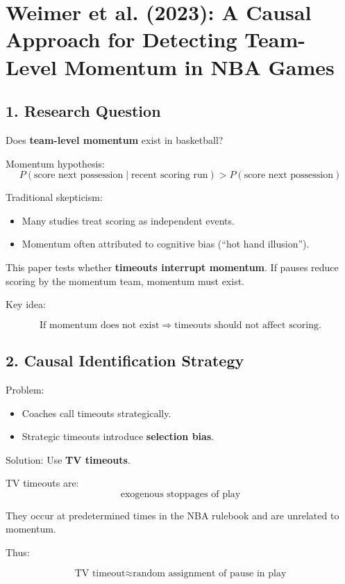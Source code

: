 \documentclass[11pt]{article}
\begin{document}
\psetheader

\section*{Weimer et al. (2023): A Causal Approach for Detecting Team-Level Momentum in NBA Games}

\subsection*{1. Research Question}

Does \textbf{team-level momentum} exist in basketball?

Momentum hypothesis:
\[
		P(\text{score next possession} \mid \text{recent scoring run})
		>
		P(\text{score next possession})
\]

Traditional skepticism:
\begin{itemize}
		\item Many studies treat scoring as independent events.
		\item Momentum often attributed to cognitive bias (``hot hand illusion'').
\end{itemize}

This paper tests whether \textbf{timeouts interrupt momentum}.
If pauses reduce scoring by the momentum team, momentum must exist.

\bigskip
Key idea:

\[
		\text{If momentum does not exist} \Rightarrow \text{timeouts should not affect scoring}.
\]

\subsection*{2. Causal Identification Strategy}

Problem:
\begin{itemize}
		\item Coaches call timeouts strategically.
		\item Strategic timeouts introduce \textbf{selection bias}.
\end{itemize}

Solution: Use \textbf{TV timeouts}.

TV timeouts are:
\[
		\text{exogenous stoppages of play}
\]

They occur at predetermined times in the NBA rulebook and are unrelated to momentum.

Thus:

\[
		\text{TV timeout} \approx \text{random assignment of pause in play}
\]
\end{document}
